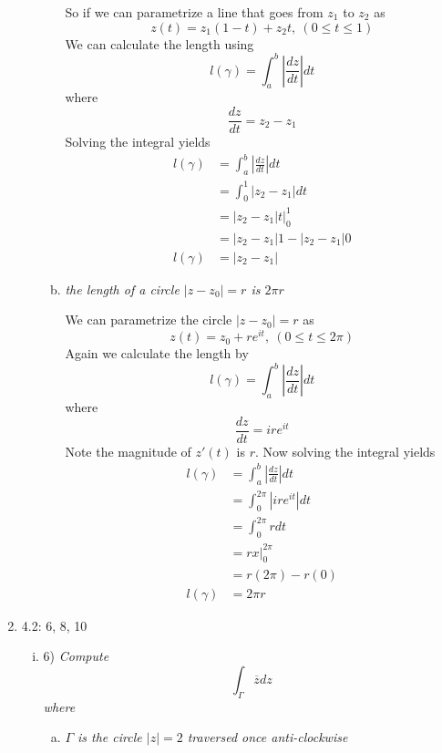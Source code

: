 \documentclass[11pt]{article}
\newcommand{\zbar}{\overline{z}}
\begin{document}
\begin{enumerate}
\begin{enumerate}[(i)]
\begin{enumerate}[(a)]
So if we can parametrize a line that goes from $z_1$ to $z_2$ as
$$z(t) = z_1(1-t) + z_2t,\ (0\le t\le 1)$$
We can calculate the length using
$$l(\gamma) = \int_a^b \left|\frac{dz}{dt}\right| dt$$
where
$$\frac{dz}{dt} = z_2-z_1$$
Solving the integral yields
\begin{align*}
l(\gamma) &= \int_a^b \left|\frac{dz}{dt}\right| dt\\
&= \int_0^1 \left|z_2-z_1\right| dt\\
&= \left.\left|z_2-z_1\right|t\right|_0^1 \\
&= \left|z_2-z_1\right|1 - \left|z_2-z_1\right|0\\
l(\gamma) &= \left|z_2-z_1\right|
\end{align*}
\item
\textit{the length of a circle $|z-z_0|=r$ is $2\pi r$}

We can parametrize the circle $|z-z_0|=r$ as 
$$z(t) = z_0 + re^{it},\ (0\le t\le 2\pi)$$
Again we calculate the length by
$$l(\gamma) = \int_a^b \left|\frac{dz}{dt}\right| dt$$
where
$$\frac{dz}{dt} = ire^{it}$$
Note the magnitude of $z'(t)$ is $r$. Now solving the integral yields
\begin{align*}
l(\gamma) &= \int_a^b \left|\frac{dz}{dt}\right| dt\\
&= \int_0^{2\pi} \left|ire^{it}\right| dt\\
&= \int_0^{2\pi} r dt\\
&= \left.rx\right|_0^{2\pi}\\
&= r(2\pi) - r(0)\\
l(\gamma) &= 2\pi r
\end{align*}
\end{enumerate}
\end{enumerate}

\item 4.2:  6, 8, 10 
\begin{enumerate}[(i)]
\item 6)
\textit{Compute
$$\int_{\Gamma} \zbar dz$$
where}
\begin{enumerate}[(a)]
\item \textit{$\Gamma$ is the circle $|z|=2$ traversed once anti-clockwise}


\end{enumerate}
\end{enumerate}
\end{enumerate}
\end{document}
